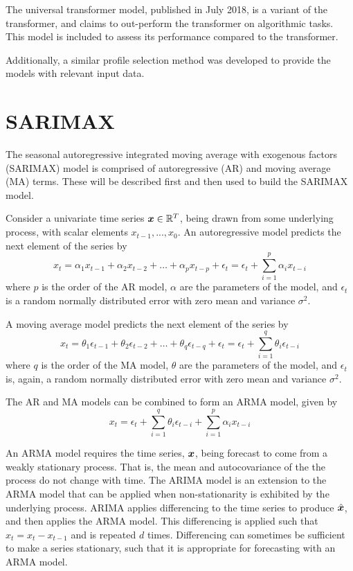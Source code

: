 The universal transformer model, published in July 2018, is a variant of the transformer, and claims to out-perform the transformer on algorithmic tasks.
This model is included to assess its performance compared to the transformer.

Additionally, a similar profile selection method was developed to provide the models with relevant input data.

\section{SARIMAX}

The seasonal autoregressive integrated moving average with exogenous factors (SARIMAX) model is comprised of autoregressive (AR) and moving average (MA) terms.
These will be described first and then used to build the SARIMAX model.

Consider a univariate time series ${\bm{x}} \in \mathbb{R}^{T}$, being drawn from some underlying process, with scalar elements $x_{t-1}, ..., x_{0}$. 
An autoregressive model predicts the next element of the series by
\begin{equation}
x_{t} = \alpha_{1}x_{t-1} + \alpha_{2}x_{t-2} + \ldots + \alpha_{p}x_{t-p} + \epsilon_{t} = \epsilon_{t} + \sum_{i=1}^{p}\alpha_{i}x_{t-i}
\end{equation}
where $p$ is the order of the AR model, $\alpha$ are the parameters of the model, and $\epsilon_{t}$ is a random normally distributed error with zero mean and variance $\sigma^2$. 

A moving average model predicts the next element of the series by
\begin{equation}
x_{t} = \theta_{1}\epsilon_{t-1} + \theta_{2}\epsilon_{t-2} + \ldots + \theta_{q}\epsilon_{t-q} + \epsilon_{t} = \epsilon_{t} + \sum_{i=1}^{q}\theta_{i}\epsilon_{t-i}
\end{equation}
where $q$ is the order of the MA model, $\theta$ are the parameters of the model, and $\epsilon_{t}$ is, again, a random normally distributed error with zero mean and variance $\sigma^2$.

The AR and MA models can be combined to form an ARMA model, given by 
\begin{equation}
x_{t} = \epsilon_{t} + \sum_{i=1}^{q}\theta_{i}\epsilon_{t-i} + \sum_{i=1}^{p}\alpha_{i}x_{t-i}
\end{equation}

An ARMA model requires the time series, ${\bm{x}}$, being forecast to come from a weakly stationary process.
That is, the mean and autocovariance of the the process do not change with time.
The ARIMA model is an extension to the ARMA model that can be applied when non-stationarity is exhibited by the underlying process.
ARIMA applies differencing to the time series to produce $\hat{{\bm{x}}}$, and then applies the ARMA model.
This differencing is applied such that $\hat{x}_{t} = x_{t} - x_{t-1}$ and is repeated $d$ times.
Differencing can sometimes be sufficient to make a series stationary, such that it is appropriate for forecasting with an ARMA model.

